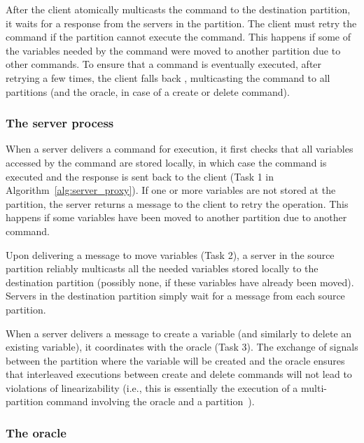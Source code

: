 After the client atomically multicasts the command to the destination partition, it waits for a response from the servers in the partition.
The client must retry the command if the partition cannot execute the command.
This happens if some of the variables needed by the command were moved to another partition due to other commands. 
To ensure that a command is eventually executed, after retrying a few times, the client falls back \ssmr{}, multicasting the command to all partitions (and the oracle, in case of a create or delete command).

\subsubsection{The server process} 

When a server delivers a command for execution, it first checks that all variables accessed by the command are stored locally, in which case the command is executed and the response is sent back to the client (Task 1 in Algorithm~\ref{alg:server_proxy}).
If one or more variables are not stored at the partition, the server returns a message to the client to retry the operation.
This happens if some variables have been moved to another partition due to another command. 

Upon delivering a message to move variables (Task 2), a server in the source partition reliably multicasts all the needed variables stored locally to the destination partition (possibly none, if these variables have already been moved).
Servers in the destination partition simply wait for a message from each source partition.

When a server delivers a message to create a variable (and similarly to delete an existing variable), it coordinates with the oracle (Task 3).
The exchange of signals between the partition where the variable will be created and the oracle ensures that interleaved executions between create and delete commands will not lead to violations of linearizability (i.e., this is essentially the execution of a multi-partition command involving the oracle and a partition~\cite{bezerra2014ssmr}).

\subsubsection{The oracle} 

